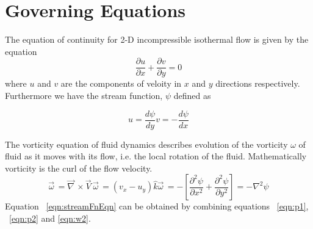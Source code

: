 \documentclass{article}
\begin{document}
\section{Governing Equations}
\label{govEqn}
The equation of continuity for 2-D incompressible isothermal flow  \citep{Pedlosky, anderson1995computational} is given by the equation
\begin{equation}
\label{eqn:continuityEqn}
\frac{\partial u}{\partial x} + \frac{\partial v}{\partial y} = 0  
\end{equation}
where $u$ and $v$ are the components of veloity in $x$ and $y$ directions respectively. Furthermore we have the stream function, $\psi$ defined as

\begin{subequations}
\begin{equation}
\label{eqn:p1}
u = \frac{d\psi}{dy} 
\end{equation}
\begin{equation}
\label{eqn:p2}
v = -\frac{d\psi}{dx}
\end{equation}
\end{subequations}

The vorticity equation of fluid dynamics describes evolution of the vorticity $\omega$ of fluid as it moves with its flow, i.e. the local rotation of the fluid. Mathematically vorticity is the curl of the flow velocity.
\begin{subequations}
\begin{equation}
\label{eqn:w1}
\vec{\omega}^{\,} = \vec{\nabla}^{\,} \times \vec{V}^{\,}
\end{equation}
\begin{equation}
\label{eqn:w2}
\vec{\omega}^{\,} = (v_x - u_y)\hat{k}
\end{equation}
\begin{equation}
\label{eqn:streamFnEqn}
\vec{\omega}^{\,} = -\left[\frac{\partial^2 \psi}{\partial x^2} +  \frac{\partial^2 \psi}{\partial y^2}\right]=-\nabla^2 \psi
\end{equation}
\end{subequations}
Equation  ~\ref{eqn:streamFnEqn} can be obtained by combining equations ~\ref{eqn:p1}, ~\ref{eqn:p2} and \ref{eqn:w2}.
\end{document}
